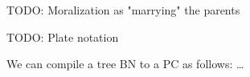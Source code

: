 \documentclass{article}
\begin{document}
TODO: Moralization as "marrying" the parents

TODO: Plate notation


We can compile a tree BN to a PC as follows: \ldots





\end{document}
